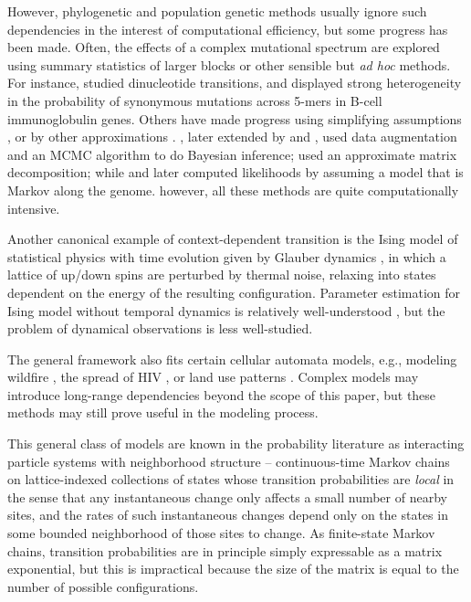 \documentclass{article}
\theoremstyle{plain}
\theoremstyle{definition}
\begin{document}
However, phylogenetic and population genetic methods usually ignore such dependencies
in the interest of computational efficiency,
but some progress has been made.
Often, the effects of a complex mutational spectrum are explored using summary statistics of larger blocks or other sensible but \textit{ad hoc} methods.
For instance, \citet{arndt2003sequence} studied dinucleotide transitions,
and \citet{yaari2013models} displayed strong heterogeneity in the probability of synonymous mutations across 5-mers
in B-cell immunoglobulin genes.
Others have made progress using simplifying assumptions \citep{berard2012accurate},
or by other approximations \citep{christensen2005pseudolikelihood,saunders2007insights}.
\citet{pedersen2000dependent}, later extended by
\citet{Hwang2004-pj,hobolth2008markov} and \citet{baele2010using}, used data augmentation and an MCMC algorithm to do Bayesian inference;
\citet{lunter2004nucleotide} used an approximate matrix decomposition;
while \citet{siepel2004phylogenetic} and later \citep{baele2010modelling} computed likelihoods by assuming a model that is Markov along the genome.
however, all these methods are quite computationally intensive.


Another canonical example of context-dependent transition is the Ising model of statistical physics
with time evolution given by Glauber dynamics \citep{glauber1963timedependent},
in which a lattice of up/down spins are perturbed by thermal noise,
relaxing into states dependent on the energy of the resulting configuration.
Parameter estimation for Ising model without temporal dynamics
is relatively well-understood \citep{pickard1982inference,frigessi1990parameter},
but the problem of dynamical observations is less well-studied.

The general framework also fits certain cellular automata models,
e.g., modeling wildfire \citep{clarke1994cellular},
the spread of HIV \citep{zorzenondossantos2001dynamics},
or land use patterns \citep{wu2002calibration}.
Complex models may introduce long-range dependencies beyond the scope of this paper,
but these methods may still prove useful in the modeling process.


This general class of models are known in the probability literature as
interacting particle systems \citep{liggett2005ips} with neighborhood structure
-- continuous-time Markov chains on lattice-indexed collections of states
whose transition probabilities are \emph{local}
in the sense that any instantaneous change only affects a small number of nearby sites,
and the rates of such instantaneous changes depend only on the states in some bounded neighborhood of those sites to change.
As finite-state Markov chains,
transition probabilities are in principle simply expressable as a matrix exponential,
but this is impractical because the size of the matrix is equal to the number of possible configurations.
\end{document}
